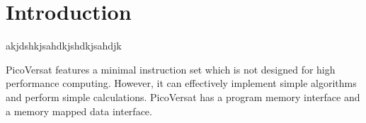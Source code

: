 \section{Introduction}

akjdshkjsahdkjshdkjsahdjk

\noindent
PicoVersat features a minimal instruction set which is not designed for high
performance computing. However, it can effectively implement simple algorithms
and perform simple calculations. PicoVersat has a program memory interface and a
memory mapped data interface.

